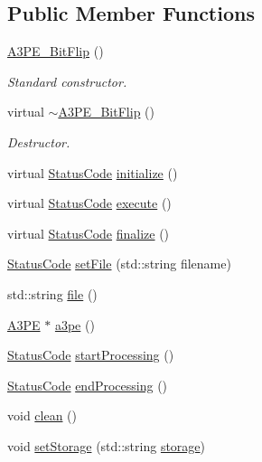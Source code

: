 \subsection*{Public Member Functions}
\begin{DoxyCompactItemize}
\item 
\hyperlink{classA3PE__BitFlip_a79aca0cefbd433bfb7f0e0cb6bc7abe1}{A3\+P\+E\+\_\+\+Bit\+Flip} ()
\begin{DoxyCompactList}\small\item\em Standard constructor. \end{DoxyCompactList}\item 
virtual \hyperlink{classA3PE__BitFlip_ab58f69a2c8d342bcad937b1dbc0bb3ed}{$\sim$\+A3\+P\+E\+\_\+\+Bit\+Flip} ()
\begin{DoxyCompactList}\small\item\em Destructor. \end{DoxyCompactList}\item 
virtual \hyperlink{classStatusCode}{Status\+Code} \hyperlink{classA3PE__BitFlip_a88dc6cfe690a518e38ff6d89026e6e0c}{initialize} ()
\item 
virtual \hyperlink{classStatusCode}{Status\+Code} \hyperlink{classA3PE__BitFlip_affa7320fb39001a6e9b5696542fe4584}{execute} ()
\item 
virtual \hyperlink{classStatusCode}{Status\+Code} \hyperlink{classA3PE__BitFlip_ab40772a001613a0e1932d1e356ccf717}{finalize} ()
\item 
\hyperlink{classStatusCode}{Status\+Code} \hyperlink{classA3PE__BitFlip_a079d34acd89f699395a9bbf6b4918205}{set\+File} (std\+::string filename)
\item 
std\+::string \hyperlink{classA3PE__BitFlip_ace874c555080ce6cb68b6bf320977a5a}{file} ()
\item 
\hyperlink{classA3PE}{A3\+PE} $\ast$ \hyperlink{classA3PE__BitFlip_ac0d0747dfdd99084dd5524fea62f11d6}{a3pe} ()
\item 
\hyperlink{classStatusCode}{Status\+Code} \hyperlink{classProcessus_a09319bde9bed93e290f69b4e04585543}{start\+Processing} ()
\item 
\hyperlink{classStatusCode}{Status\+Code} \hyperlink{classProcessus_a5e4da662989d356b89d490b89c7afbfd}{end\+Processing} ()
\item 
void \hyperlink{classProcessus_aaeb17673b98d2b39f3aa780e335e0968}{clean} ()
\item 
void \hyperlink{classProcessus_ad57a29b33f9021eda9f6929136f1784f}{set\+Storage} (std\+::string \hyperlink{classProcessus_a33fa1a0b54a636e5cdd680669fd9ea51}{storage})

\end{DoxyCompactItemize}
